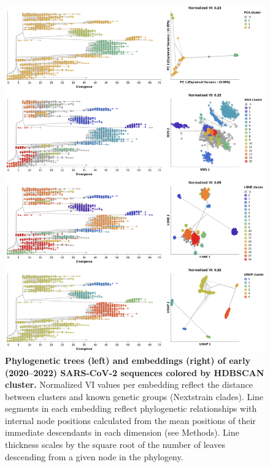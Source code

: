 \documentclass[webpdf,contemporary,large,single]{oup-authoring-template}%
\theoremstyle{thmstyleone}%
\theoremstyle{thmstyletwo}%
\theoremstyle{thmstylethree}%
\begin{document}
\begin{figure}[!h]
\includegraphics[width=0.9\columnwidth]{figures/sarscov2-embeddings-by-cluster-vs-Nextstrain_clade.png}
\caption{{\bf Phylogenetic trees (left) and embeddings (right) of early (2020--2022) SARS-CoV-2 sequences colored by HDBSCAN cluster.}
  Normalized VI values per embedding reflect the distance between clusters and known genetic groups (Nextstrain clades).
  Line segments in each embedding reflect phylogenetic relationships with internal node positions calculated from the mean positions of their immediate descendants in each dimension (see Methods).
  Line thickness scales by the square root of the number of leaves descending from a given node in the phylogeny.
}
\label{fig:sars-cov-2-2020-2022-clusters-vs-Nextstrain-clade}
\end{figure}
\end{document}
